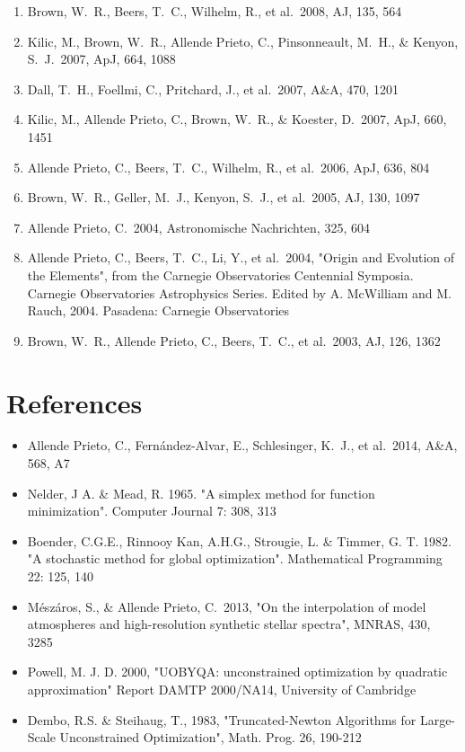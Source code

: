 \documentclass[12pt]{article}
\begin{document}
\begin{enumerate}
\item Brown, W.~R., Beers, 
T.~C., Wilhelm, R., et al.\ 2008, AJ, 135, 564 


\item Kilic, M., Brown, W.~R., 
Allende Prieto, C., Pinsonneault, M.~H., 
\& Kenyon, S.~J.\ 2007, ApJ, 664, 1088 


\item Dall, T.~H., Foellmi, C., Pritchard, J., et al.\ 2007, A\&A, 470, 1201 


\item Kilic, M., Allende 
Prieto, C., Brown, W.~R., \& Koester, D.\ 2007, ApJ, 660, 1451 


\item Allende Prieto, 
C., Beers, T.~C., Wilhelm, R., et al.\ 2006, ApJ, 636, 804 


\item Brown, W.~R., Geller, 
M.~J., Kenyon, S.~J., et al.\ 2005, AJ, 130, 1097 


\item Allende Prieto, C.\ 
2004, Astronomische Nachrichten, 325, 604 


\item Allende Prieto, 
C., Beers, T.~C., Li, Y., et al.\ 2004, 
"Origin and Evolution of the Elements", from the Carnegie Observatories Centennial Symposia. Carnegie Observatories Astrophysics Series. Edited by A. McWilliam and M. Rauch, 2004. Pasadena: Carnegie Observatories

\item Brown, W.~R., Allende 
Prieto, C., Beers, T.~C., et al.\ 2003, AJ, 126, 1362 

\end{enumerate}

\section{References}

\begin{itemize}
\item Allende Prieto, C., Fern{\'a}ndez-Alvar, E., Schlesinger, K.~J., et al.\ 2014, A\&A, 568, A7 
\item Nelder, J A. \&  Mead, R. 1965. "A simplex method for function minimization". 
Computer Journal 7: 308, 313
\item  Boender, C.G.E., Rinnooy Kan, A.H.G., Strougie, L. \& Timmer, G. T. 1982. 
"A stochastic method for global optimization". Mathematical Programming 22: 125, 140
\item M{\'e}sz{\'a}ros, S., \& Allende Prieto, C.\ 2013, "On the interpolation of 
model atmospheres and high-resolution synthetic stellar spectra", MNRAS, 430, 3285 
\item Powell, M. J. D. 2000, "UOBYQA: unconstrained optimization by
quadratic approximation"  Report DAMTP 2000/NA14, University of Cambridge
\item Dembo, R.S. \& Steihaug, T., 1983, "Truncated-Newton Algorithms for 
Large-Scale Unconstrained Optimization", Math. Prog. 26, 190-212 
\end{itemize}
\end{document}
